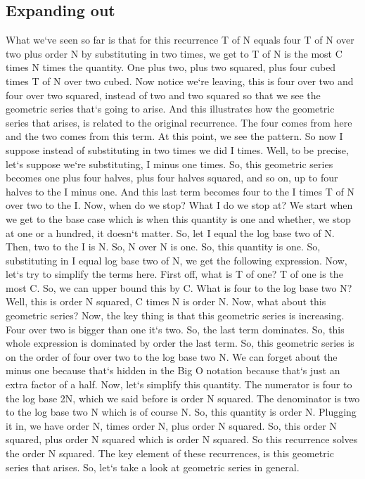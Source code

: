 \subsection{Expanding out}
What we`ve seen so far is that for this recurrence T of N equals four T of N over two plus order N by substituting in two times, we get to T of N is the most C times N times the quantity.
One plus two, plus two squared, plus four cubed times T of N over two cubed.
Now notice we`re leaving, this is four over two and four over two squared, instead of two and two squared so that we see the geometric series that`s going to arise.
And this illustrates how the geometric series that arises, is related to the original recurrence.
The four comes from here and the two comes from this term.
At this point, we see the pattern.
So now I suppose instead of substituting in two times we did I times.
Well, to be precise, let`s suppose we`re substituting, I minus one times.
So, this geometric series becomes one plus four halves, plus four halves squared, and so on, up to four halves to the I minus one.
And this last term becomes four to the I times T of N over two to the I\@.
Now, when do we stop? What I do we stop at? We start when we get to the base case which is when this quantity is one and whether, we stop at one or a hundred, it doesn`t matter.
So, let I equal the log base two of N\@.
Then, two to the I is N\@.
So, N over N is one.
So, this quantity is one.
So, substituting in I equal log base two of N, we get the following expression.
Now, let`s try to simplify the terms here.
First off, what is T of one? T of one is the most C\@.
So, we can upper bound this by C\@.
What is four to the log base two N? Well, this is order N squared, C times N is order N\@.
Now, what about this geometric series? Now, the key thing is that this geometric series is increasing.
Four over two is bigger than one it`s two.
So, the last term dominates.
So, this whole expression is dominated by order the last term.
So, this geometric series is on the order of four over two to the log base two N\@.
We can forget about the minus one because that`s hidden in the Big O notation because that`s just an extra factor of a half.
Now, let`s simplify this quantity.
The numerator is four to the log base 2N, which we said before is order N squared.
The denominator is two to the log base two N which is of course N\@.
So, this quantity is order N\@.
Plugging it in, we have order N, times order N, plus order N squared.
So, this order N squared, plus order N squared which is order N squared.
So this recurrence solves the order N squared.
The key element of these recurrences, is this geometric series that arises.
So, let`s take a look at geometric series in general.


